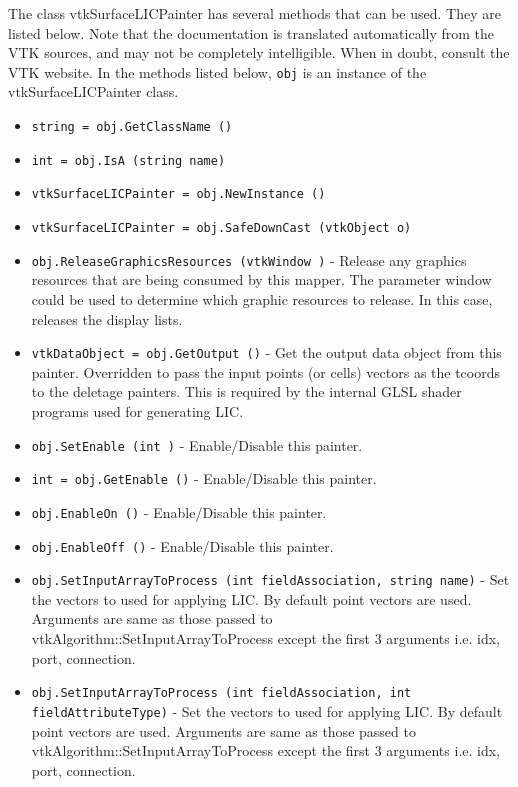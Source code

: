 The class vtkSurfaceLICPainter has several methods that can be used.
  They are listed below.
Note that the documentation is translated automatically from the VTK sources,
and may not be completely intelligible.  When in doubt, consult the VTK website.
In the methods listed below, \verb|obj| is an instance of the vtkSurfaceLICPainter class.
\begin{itemize}
\item  \verb|string = obj.GetClassName ()|

\item  \verb|int = obj.IsA (string name)|

\item  \verb|vtkSurfaceLICPainter = obj.NewInstance ()|

\item  \verb|vtkSurfaceLICPainter = obj.SafeDownCast (vtkObject o)|

\item  \verb|obj.ReleaseGraphicsResources (vtkWindow )| -  Release any graphics resources that are being consumed by this mapper.
 The parameter window could be used to determine which graphic
 resources to release. In this case, releases the display lists.

\item  \verb|vtkDataObject = obj.GetOutput ()| -  Get the output data object from this painter. 
 Overridden to pass the input points (or cells) vectors as the tcoords to
 the deletage painters. This is required by the internal GLSL shader
 programs used for generating LIC.

\item  \verb|obj.SetEnable (int )| -  Enable/Disable this painter.

\item  \verb|int = obj.GetEnable ()| -  Enable/Disable this painter.

\item  \verb|obj.EnableOn ()| -  Enable/Disable this painter.

\item  \verb|obj.EnableOff ()| -  Enable/Disable this painter.

\item  \verb|obj.SetInputArrayToProcess (int fieldAssociation, string name)| -  Set the vectors to used for applying LIC. By default point vectors are
 used. Arguments are same as those passed to
 vtkAlgorithm::SetInputArrayToProcess except the first 3 arguments i.e. idx,
 port, connection.

\item  \verb|obj.SetInputArrayToProcess (int fieldAssociation, int fieldAttributeType)| -  Set the vectors to used for applying LIC. By default point vectors are
 used. Arguments are same as those passed to
 vtkAlgorithm::SetInputArrayToProcess except the first 3 arguments i.e. idx,
 port, connection.


\end{itemize}
